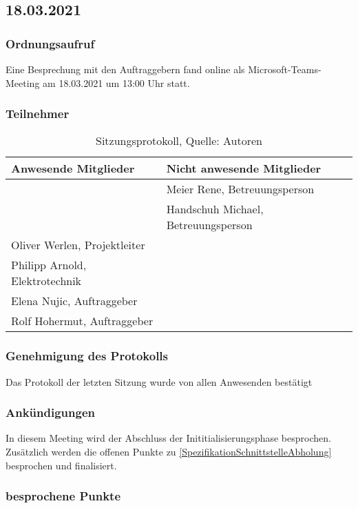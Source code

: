 \subsection{18.03.2021}
\subsubsection{Ordnungsaufruf}
Eine Besprechung mit den Auftraggebern fand online als Microsoft-Teams-Meeting am 18.03.2021 um 13:00 Uhr statt.
\subsubsection{Teilnehmer}
\begin{table}[H]
	\setlength\extrarowheight{2pt} %
	\begin{tabularx}{\textwidth}{|X|X|}
		\hline
		\textbf{Anwesende Mitglieder} &  \textbf{Nicht anwesende Mitglieder} \\
		\hline
		& Meier Rene, Betreuungsperson  \\
		& Handschuh Michael, Betreuungsperson   \\
		Oliver Werlen, Projektleiter &  \\
		Philipp Arnold, Elektrotechnik & \\
		Elena Nujic, Auftraggeber & \\
		Rolf Hohermut, Auftraggeber & \\
		\hline
	\end{tabularx}
	\caption{ \label{tbl: Teilnehmerliste vom 18.03.2021}Sitzungsprotokoll, Quelle: Autoren}
\end{table}
\subsubsection{Genehmigung des Protokolls}
Das Protokoll der letzten Sitzung wurde von allen Anwesenden bestätigt
\subsubsection{Ankündigungen}
In diesem Meeting wird der Abschluss der Inititialisierungsphase besprochen. Zusätzlich werden die offenen Punkte zu \ref{SpezifikationSchnittstelleAbholung} besprochen und finalisiert. 
\subsubsection{besprochene Punkte}
